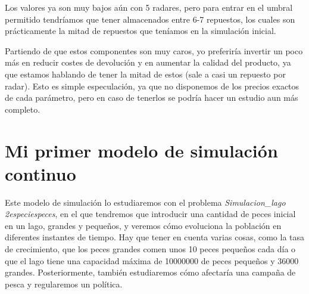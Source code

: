 \documentclass[11pt,a4paper]{report}
\begin{document}
\begin{table}[H]
\centering
{}
\end{table}

Los valores ya son muy bajos aún con 5 radares, pero para entrar en el umbral permitido tendríamos que tener almacenados entre 6-7 repuestos,
los cuales son prácticamente la mitad de repuestos que teníamos en la simulación inicial.

Partiendo de que estos componentes son muy caros, yo preferiría invertir un poco más en reducir costes de devolución y en aumentar la calidad
del producto, ya que estamos hablando de tener la mitad de estos (sale a casi un repuesto por radar). Esto es simple especulación, ya que no
disponemos de los precios exactos de cada parámetro, pero en caso de tenerlos se podría hacer un estudio aun más completo.



\chapter{Mi primer modelo de simulación continuo}

Este modelo de simulación lo estudiaremos con el problema \textit{Simulacion\_lago 2especiespeces}, en el que tendremos que introducir una
cantidad de peces inicial en un lago, grandes y pequeños, y veremos cómo evoluciona la población en diferentes instantes de tiempo. Hay
que tener en cuenta varias cosas, como la tasa de crecimiento, que los peces grandes comen unos 10 peces pequeños cada día o que el
lago tiene una capacidad máxima de 10000000 de peces pequeños y 36000 grandes. Posteriormente, también estudiaremos cómo afectaría una
campaña de pesca y regularemos un política.
\end{document}
